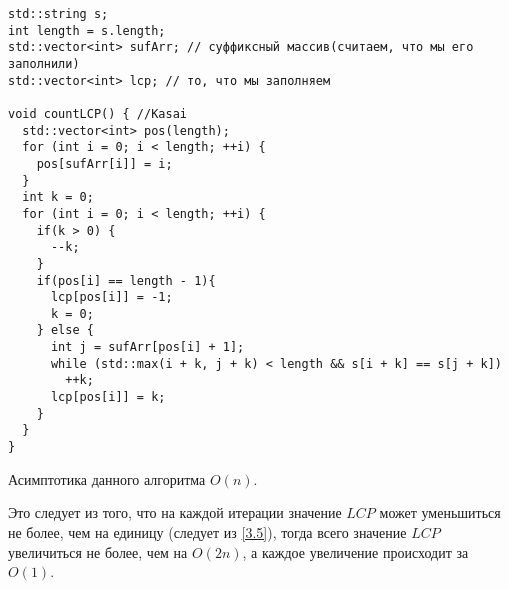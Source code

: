 \begin{lstlisting}
std::string s;
int length = s.length;
std::vector<int> sufArr; // суффиксный массив(считаем, что мы его заполнили)
std::vector<int> lcp; // то, что мы заполняем

void countLCP() { //Kasai
  std::vector<int> pos(length);
  for (int i = 0; i < length; ++i) {
    pos[sufArr[i]] = i;
  }
  int k = 0;
  for (int i = 0; i < length; ++i) {
    if(k > 0) {
      --k;
    }
    if(pos[i] == length - 1){
      lcp[pos[i]] = -1;
      k = 0;
    } else {
      int j = sufArr[pos[i] + 1];
      while (std::max(i + k, j + k) < length && s[i + k] == s[j + k])
        ++k;
      lcp[pos[i]] = k;
    }
  }
}
\end{lstlisting}

\begin{remark}
        Асимптотика данного алгоритма $O(n)$.
\end{remark}
Это следует из того, что на каждой итерации значение $LCP$ может уменьшиться не более, чем на единицу
(следует из \ref{3.5}), тогда всего значение $LCP$ увеличиться не более, чем на $O(2n)$, а каждое увеличение
происходит за  $O(1)$.
